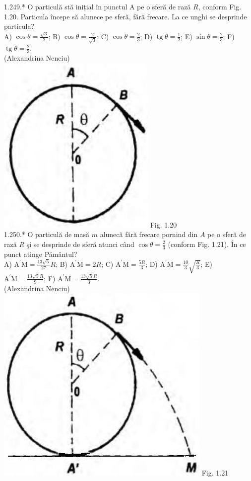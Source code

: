 1.249.* O particulă stă inițial în punctul A pe o sferă de rază $R$, conform Fig. 1.20. Particula începe să alunece pe sferă, fără frecare. La ce unghi se desprinde particula?\\ A) $\cos \theta=\frac{\sqrt{3}}{2}$; B) $\cos \theta=\frac{2}{\sqrt{3}}$; C) $\cos \theta=\frac{2}{3}$; D) $\operatorname{tg} \theta=\frac{1}{2}$; E) $\sin \theta=\frac{2}{3}$; F) $\operatorname{tg} \theta=\frac{2}{3}$.\\ (Alexandrina Nenciu)\\ \includegraphics[width=0.4\linewidth]{images/2025_07_01_5b3ff9fa0d508c8e9f17g-057(1)} Fig. 1.20\\

1.250.* O particulă de masă $m$ alunecă fără frecare pornind din $A$ pe o sferă de rază $R$ şi se desprinde de sferă atunci când $\cos \theta=\frac{2}{3}$ (conform Fig. 1.21). În ce punct atinge Pámântul?\\ A) $\mathrm{A}^{\prime} \mathrm{M}=\frac{13 \sqrt{5}}{27} R$; B) $\mathrm{A}^{\prime} \mathrm{M}=2 R$; C) $\mathrm{A}^{\prime} \mathrm{M}=\frac{5 R}{3}$; D) $\mathrm{A}^{\prime} \mathrm{M}=\frac{10}{3} \sqrt{\frac{R}{3}}$; E) $\mathrm{A}^{\prime} \mathrm{M}=\frac{13 \sqrt{5} R}{9}$; F) $\mathrm{A}^{\prime} \mathrm{M}=\frac{13 \sqrt{5} R}{3}$.\\ (Alexandrina Nenciu)\\ \includegraphics[width=0.4\linewidth]{images/2025_07_01_5b3ff9fa0d508c8e9f17g-057} Fig. 1.21\\

